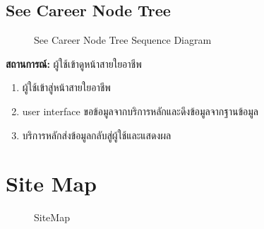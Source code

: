 \subsection{See Career Node Tree}
\begin{figure}[H]\centering
    \setlength{\fboxrule}{0.2mm} %
    \caption{See Career Node Tree Sequence Diagram}\label{fig:nodeTreeSeqDiagram}
\end{figure}
\textbf{สถานการณ์: }ผู้ใช้เข้าดูหน้าสายใยอาชีพ
\begin{enumerate}
    \item ผู้ใช้เข้าสู่หน้าสายใยอาชีพ
    \item user interface ขอข้อมูลจากบริการหลักและดึงข้อมูลจากฐานข้อมูล
    \item บริการหลักส่งข้อมูลกลับสู่ผู้ใช้และแสดงผล
\end{enumerate}


\section{Site Map}
\begin{figure}[H]\centering
    \setlength{\fboxrule}{0.2mm} %
    \setlength{\fboxsep}{0.5cm}
    \caption{SiteMap}\label{fig:siteMap}
\end{figure}

